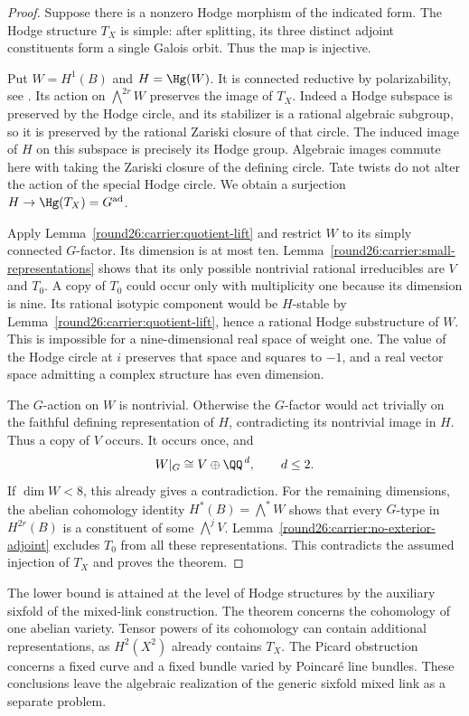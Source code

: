 \begin{proof}
Suppose there is a nonzero Hodge morphism of the indicated
form. The Hodge structure $T_X$ is simple: after splitting,
its three distinct adjoint constituents form a single
Galois orbit. Thus the map is injective.

Put $W=H^1(B)$ and $H=\Hg(W)$. It is connected reductive by
polarizability, see \cite[Proposition~3.6]{Del82}. Its action
on $\bigwedge^{2r}W$ preserves the image of $T_X$. Indeed a
Hodge subspace is preserved by the Hodge circle, and its
stabilizer is a rational algebraic subgroup, so it is
preserved by the rational Zariski closure of that circle.
The induced image of $H$ on this subspace is precisely its
Hodge group. Algebraic images commute here with taking the
Zariski closure of the defining circle. Tate twists do not
alter the action of the special Hodge circle. We obtain a
surjection $H\to\Hg(T_X)=G^{\mathrm{ad}}$.

Apply Lemma~\ref{round26:carrier:quotient-lift} and restrict $W$ to
its simply connected $G$-factor. Its dimension is at most
ten. Lemma~\ref{round26:carrier:small-representations} shows that
its only possible nontrivial rational irreducibles are $V$
and $T_0$. A copy of $T_0$ could occur only with multiplicity
one because its dimension is nine. Its rational isotypic
component would be $H$-stable by
Lemma~\ref{round26:carrier:quotient-lift}, hence a rational Hodge
substructure of $W$. This is impossible for a
nine-dimensional real space of weight one. The value of
the Hodge circle at $i$ preserves that space and squares to
$-1$, and a real vector space admitting a complex structure
has even dimension.

The $G$-action on $W$ is nontrivial. Otherwise the
$G$-factor would act trivially on the faithful defining
representation of $H$, contradicting its nontrivial image
in $H$. Thus a copy of $V$ occurs. It occurs once, and
\[
 W|_G\cong V\oplus\QQ^{\,d},\qquad d\le2.
\]
If $\dim W<8$, this already gives a contradiction.
For the remaining dimensions, the abelian cohomology
identity $H^*(B)=\bigwedge^*W$ shows that every $G$-type in
$H^{2r}(B)$ is a constituent of some $\bigwedge^jV$.
Lemma~\ref{round26:carrier:no-exterior-adjoint} excludes $T_0$
from all these representations. This contradicts the
assumed injection of $T_X$ and proves the theorem.
\end{proof}

\begin{remark}
The lower bound is attained at the level of Hodge structures
by the auxiliary sixfold of the mixed-link construction.
The theorem concerns the cohomology of one abelian variety.
Tensor powers of its cohomology can contain additional
representations, as $H^2(X^2)$ already contains $T_X$.
The Picard obstruction concerns a fixed curve and a fixed
bundle varied by Poincar\'e line bundles. These conclusions
leave the algebraic realization of the generic sixfold
mixed link as a separate problem.
\end{remark}
